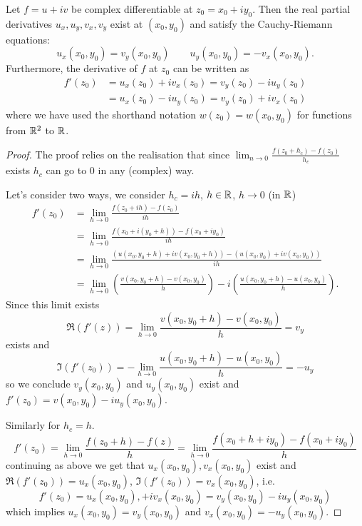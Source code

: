 \documentclass[10pt, a4paper]{article}
\begin{document}
\begin{proposition}
    Let $f = u + iv$ be complex differentiable at $z_0 = x_0 + iy_0$.
    Then the real partial derivatives $u_x, u_y, v_x, v_y$ exist at $(x_0, y_0)$ and satisfy the Cauchy-Riemann equations:
    \[
    u_x(x_0, y_0) = v_y(x_0, y_0)\qquad u_y(x_0, y_0) = -v_x(x_0, y_0).
    \]
    Furthermore,
    the derivative of $f$ at $z_0$ can be written as
    \begin{align*}
        f'(z_0) &= u_x(z_0) + iv_x(z_0) = v_y(z_0) - iu_y(z_0) \\
        &= u_x(z_0) - iu_y(z_0) = v_y(z_0) + iv_x(z_0)
    \end{align*}
    where we have used the shorthand notation $w(z_0) = w(x_0, y_0)$ for functions from $\mathbb{R} ^ 2$ to $\mathbb{R}$.

    \begin{proof}
        The proof relies on the realisation that since $\lim_{n \to 0}\frac{f(z_0 + h_c) - f(z_0)}{h_c}$ exists $h_c$ can go to $0$ in any
        (complex)
        way.

        Let's consider two ways,
        we consider $h_c = ih$,
        $h \in \mathbb{R}$,
        $h \to 0$
        (in $\mathbb{R}$)
        \begin{align*}
            f'(z_0) &= \lim_{h \to 0}\frac{f(z_0 + ih) - f(z_0)}{ih} \\
            &= \lim_{h \to 0}\frac{f(x_0 + i(y_0 + h)) - f(x_0 + iy_0)}{ih} \\
            &= \lim_{h \to 0}\frac{(u(x_0, y_0 + h) + iv(x_0, y_0 + h)) - (u(x_0, y_0) + iv(x_0, y_0))}{ih} \\
            &= \lim_{h \to 0}\left(\frac{v(x_0, y_0 + h) - v(x_0, y_0)}{h}\right) - i\left(\frac{u(x_0, y_0 + h) - u(x_0, y_0)}{h}\right).
        \end{align*}
        Since this limit exists
        \[
        \Re(f'(z)) = \lim_{h \to 0}\frac{v(x_0, y_0 + h) - v(x_0, y_0)}{h} = v_y
        \]
        exists and
        \[
        \Im(f'(z_0)) = -\lim_{h \to 0}\frac{u(x_0, y_0 + h) - u(x_0, y_0)}{h} = -u_y
        \]
        so we conclude $v_y(x_0, y_0)$ and $u_y(x_0, y_0)$ exist and $f'(z_0) = v(x_0, y_0) - iu_y(x_0, y_0)$.
        
        Similarly for $h_c = h$.
        \[
        f'(z_0) = \lim_{h \to 0}\frac{f(z_0 + h) - f(z)}{h} = \lim_{h \to 0}\frac{f(x_0 + h + iy_0) - f(x_0 + iy_0)}{h}
        \]
        continuing as above we get that $u_x(x_0, y_0), v_x(x_0, y_0)$ exist and $\Re(f'(z_0)) = u_x(x_0, y_0)$,
        $\Im(f'(z_0)) = v_x(x_0, y_0)$,
        i.e.
        \[
        f'(z_0) = u_x(x_0, y_0), + iv_x(x_0, y_0) = v_y(x_0, y_0) - iu_y(x_0, y_0)
        \]
        which implies $u_x(x_0, y_0) = v_y(x_0, y_0)$ and $v_x(x_0, y_0) = -u_y(x_0, y_0)$.
    \end{proof}
\end{proposition}
\end{document}
